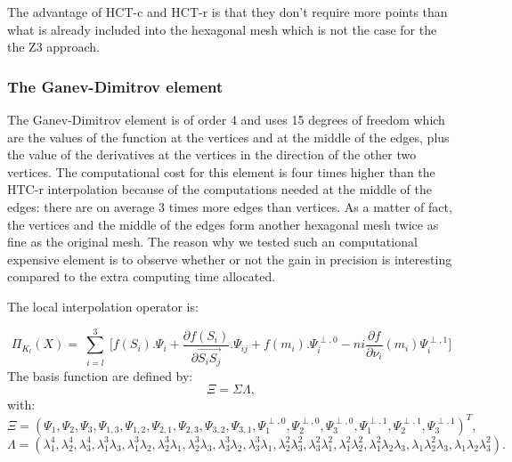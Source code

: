 \documentclass[proc]{edpsmath}
\begin{document}
The advantage of HCT-c and HCT-r is that they don't require more points than what is already included into the hexagonal mesh which is not the case for the the Z3 approach.

\subsubsection{The Ganev-Dimitrov element}
The Ganev-Dimitrov element is of order 4 and uses 15 degrees of freedom which are the values of the function at the vertices and at the middle of the edges, plus the value of the derivatives at the vertices in the direction of the other two vertices. The computational cost for this element is four times higher than the HTC-r interpolation because of the computations needed at the middle of the edges: there are on average 3 times more edges than vertices. As a matter of fact, the vertices and the middle of the edges form another hexagonal mesh twice as fine as the original mesh. The reason why we tested such an computational expensive element is to observe whether or not the gain in precision is interesting compared to the extra computing time allocated. 

\noindent The local interpolation operator is:

\begin{equation*}
 \Pi_{K_l} (X) = \sum \limits_{\substack{i=l }}^{3}{ [f(S_i).\Psi_i +  \frac{\partial f(S_i)}{\partial  \overrightarrow{ S_i S_j } }.\Psi_{ij} } + f(m_i).\Psi^{\perp,0}_i  - ni \frac{\partial f}{\partial \nu_i}(m_i) \Psi^{\perp,1}_i] 
\end{equation*}
\noindent The basis function are defined by: 
\begin{equation*}
\Xi =  \Sigma \Lambda,
\end{equation*} 
 \noindent with:\\
\begin{equation*}
\Xi=(\Psi_1, \Psi_2, \Psi_3, \Psi_{1,3},\Psi_{1,2},\Psi_{2,1},\Psi_{2,3} ,\Psi_{3,2},\Psi_{3,1},\Psi_1^{\perp,0} ,\Psi_2^{\perp,0},\Psi_3^{\perp,0},\Psi_1^{\perp,1},\Psi_2^{\perp,1},\Psi_3^{\perp,1})^T,
\end{equation*} 
\begin{equation*}
\Lambda = ( \lambda_1^4,\lambda_2^4,\lambda_3^4,\lambda_1^3\lambda_3,\lambda_1^3\lambda_2,\lambda_2^3\lambda_1,\lambda_2^3\lambda_3 ,\lambda_3^3\lambda_2,\lambda_3^3\lambda_1,\lambda_2^2\lambda_3^2,\lambda_3^2\lambda_1^2,\lambda_1^2\lambda_2^2,\lambda_1^2\lambda_2\lambda_3,\lambda_1\lambda_2^2\lambda_3,\lambda_1\lambda_2\lambda_3^2).
\end{equation*} 
  
\end{document}
